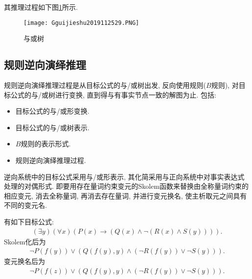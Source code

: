 其推理过程如下图\ref{AI32fig2019120129}所示.
\begin{figure}[H]
\centering
\texttt{[image: Gguijieshu2019112529.PNG]}
\caption{与或树}
\label{AI32fig2019120129}
\end{figure}
\subsection{规则逆向演绎推理}
规则逆向演绎推理过程是从目标公式的与/或树出发, 反向使用规则($B$规则), 对目标公式的与/或树进行变换, 直到得与有事实节点一致的解图为止. 包括:
\begin{itemize}
\item 目标公式的与/或形变换.
\item 目标公式的与/或树表示.
\item $B$规则的表示形式.
\item 规则逆向演绎推理过程.
\end{itemize}

逆向系统中的目标公式采用与/或形表示, 其化简采用与正向系统中对事实表达式处理的对偶形式.
即要用存在量词约束变元的Skolem函数来替换由全称量词约束的相应变元, 消去全称量词, 再消去存在量词, 并进行变元换名, 使主析取元之间具有不同的变元名.
\begin{example}
有如下目标公式:
\begin{align}
  (\exists  y) (\forall x)(P(x)\rightarrow (Q(x)\wedge \neg (R(x)\wedge S(y)))).
\end{align}
Skolem化后为
\begin{align}
  \neg P(f(y))\vee (Q(f(y), y)\wedge (\neg R(f(y))\vee \neg S(y))).
\end{align}
变元换名后为
\begin{align}
  \neg P(f(z))\vee (Q(f(y), y)\wedge (\neg R(f(y))\vee \neg S(y))).
\end{align}
\end{example}

